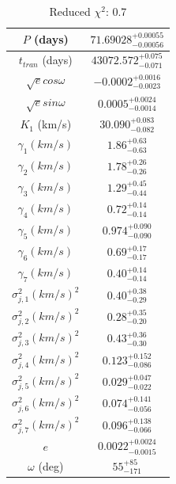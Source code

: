 \documentclass{article}
\begin{document}
\begin{table}
\centering
\caption{Reduced $\chi^2$: 0.7}
\begin{tabular}{| c | c |}
\hline
$P$ (days) & $71.69028^{+0.00055}_{-0.00056}$ \\
\hline
$t_{tran}$ (days) & $43072.572^{+0.075}_{-0.071}$ \\
\hline
$\sqrt{e} cos\omega$ & $-0.0002^{+0.0016}_{-0.0023}$ \\
\hline
$\sqrt{e} sin\omega$ & $0.0005^{+0.0024}_{-0.0014}$ \\
\hline
$K_1$ (km/s) & $30.090^{+0.083}_{-0.082}$ \\
\hline
$\gamma_{1} (km/s)$ & $1.86^{+0.63}_{-0.63}$ \\
\hline
$\gamma_{2} (km/s)$ & $1.78^{+0.26}_{-0.26}$ \\
\hline
$\gamma_{3} (km/s)$ & $1.29^{+0.45}_{-0.44}$ \\
\hline
$\gamma_{4} (km/s)$ & $0.72^{+0.14}_{-0.14}$ \\
\hline
$\gamma_{5} (km/s)$ & $0.974^{+0.090}_{-0.090}$ \\
\hline
$\gamma_{6} (km/s)$ & $0.69^{+0.17}_{-0.17}$ \\
\hline
$\gamma_{7} (km/s)$ & $0.40^{+0.14}_{-0.14}$ \\
\hline
$\sigma^2_{j,1} (km/s)^2$ & $0.40^{+0.38}_{-0.29}$ \\
\hline
$\sigma^2_{j,2} (km/s)^2$ & $0.28^{+0.35}_{-0.20}$ \\
\hline
$\sigma^2_{j,3} (km/s)^2$ & $0.43^{+0.36}_{-0.30}$ \\
\hline
$\sigma^2_{j,4} (km/s)^2$ & $0.123^{+0.152}_{-0.086}$ \\
\hline
$\sigma^2_{j,5} (km/s)^2$ & $0.029^{+0.047}_{-0.022}$ \\
\hline
$\sigma^2_{j,6} (km/s)^2$ & $0.074^{+0.141}_{-0.056}$ \\
\hline
$\sigma^2_{j,7} (km/s)^2$ & $0.096^{+0.138}_{-0.066}$ \\
\hline
$e$ & $0.0022^{+0.0024}_{-0.0015}$ \\
\hline
$\omega$ (deg) & $55^{+85}_{-171}$ \\
\hline
\end{tabular}
\end{table}
\end{document}
